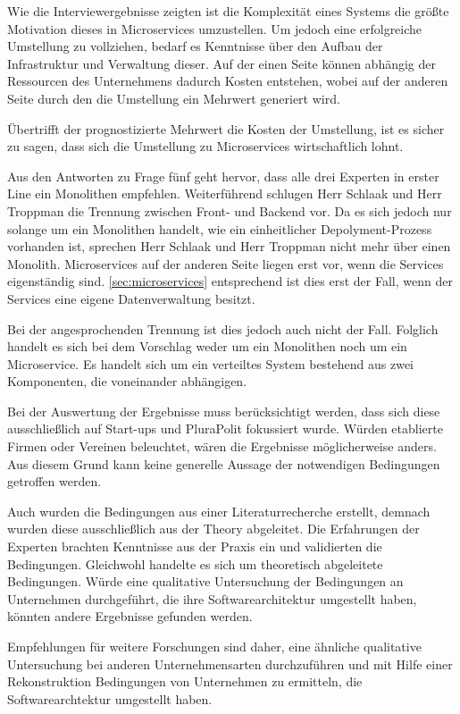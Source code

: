 Wie die Interviewergebnisse zeigten ist die Komplexität eines Systems die größte Motivation dieses in Microservices umzustellen. Um jedoch eine erfolgreiche Umstellung zu vollziehen, bedarf es Kenntnisse über den Aufbau der Infrastruktur und Verwaltung dieser. Auf der einen Seite können abhängig der Ressourcen des Unternehmens dadurch Kosten entstehen, wobei auf der anderen Seite durch den die Umstellung ein Mehrwert generiert wird.

Übertrifft der prognostizierte Mehrwert die Kosten der Umstellung, ist es sicher zu sagen, dass sich die Umstellung zu Microservices wirtschaftlich lohnt.

Aus den Antworten zu Frage fünf geht hervor, dass alle drei Experten in erster Line ein Monolithen empfehlen. Weiterführend schlugen Herr Schlaak und Herr Troppman die Trennung zwischen Front- und Backend vor.
Da es sich jedoch nur solange um ein Monolithen handelt, wie ein einheitlicher Depolyment-Prozess vorhanden ist, sprechen Herr Schlaak und Herr Troppman nicht mehr über einen Monolith.
Microservices auf der anderen Seite liegen erst vor, wenn die Services eigenständig sind. \cref{sec:microservices} entsprechend ist dies erst der Fall, wenn der Services eine eigene Datenverwaltung besitzt.

Bei der angesprochenden Trennung ist dies jedoch auch nicht der Fall. Folglich handelt es sich bei dem Vorschlag weder um ein Monolithen noch um ein Microservice. Es handelt sich um ein verteiltes System bestehend aus zwei Komponenten, die voneinander abhängigen.

Bei der Auswertung der Ergebnisse muss berücksichtigt werden, dass sich diese ausschließlich auf Start-ups und PluraPolit fokussiert wurde. Würden etablierte Firmen oder Vereinen beleuchtet, wären die Ergebnisse möglicherweise anders. Aus diesem Grund kann keine generelle Aussage der notwendigen Bedingungen getroffen werden.

Auch wurden die Bedingungen aus einer Literaturrecherche erstellt, demnach wurden diese ausschließlich aus der Theory abgeleitet. Die Erfahrungen der Experten brachten Kenntnisse aus der Praxis ein und validierten die Bedingungen. 
Gleichwohl handelte es sich um theoretisch abgeleitete Bedingungen.
Würde eine qualitative Untersuchung der Bedingungen an Unternehmen durchgeführt, die ihre Softwarearchitektur umgestellt haben, könnten andere Ergebnisse gefunden werden.

Empfehlungen für weitere Forschungen sind daher, eine ähnliche qualitative Untersuchung bei anderen Unternehmensarten durchzuführen und mit Hilfe einer Rekonstruktion Bedingungen von Unternehmen zu ermitteln, die Softwarearchtektur umgestellt haben.

